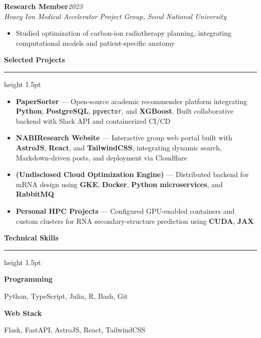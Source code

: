 \documentclass[11pt,a4paper]{article}
\newcommand{\cvsection}[1]{%
  \vspace{1em}
  {\color{sectioncolor}\Large\bfseries #1}
  \vspace{0.2em}
  {\color{sectioncolor}\hrule height 1.5pt}
  \vspace{0.5em}
}
\newcommand{\years}[1]{{\color{gray}\textit{#1}}}
\newenvironment{cvitems}{\begin{itemize}[leftmargin=1.5em, itemsep=0.3em, topsep=0.3em]}{\end{itemize}}
\newcommand{\role}[2]{%
  \textbf{\large #1}\hfill\years{#2}\\[0.1em]
}
\newcommand{\place}[1]{%
  {\color{primarycolor}\textit{#1}}\\[0.3em]
}
\begin{document}
\vspace{0.5em}

\role{Research Member}{2023}
\place{Heavy Ion Medical Accelerator Project Group, Seoul National University}
\begin{cvitems}
  \item Studied optimization of carbon-ion radiotherapy planning, integrating computational models and patient-specific anatomy
\end{cvitems}

\cvsection{Selected Projects}
\begin{cvitems}
  \item \textbf{\color{primarycolor}PaperSorter} — Open-source academic recommender platform integrating \textbf{Python}, \textbf{PostgreSQL}, \texttt{pgvector}, and \textbf{XGBoost}. Built collaborative backend with Slack API and containerized CI/CD
  
  \item \textbf{\color{primarycolor}NABIResearch Website} — Interactive group web portal built with \textbf{AstroJS}, \textbf{React}, and \textbf{TailwindCSS}, integrating dynamic search, Markdown-driven posts, and deployment via Cloudflare
  
  \item \textbf{\color{primarycolor}(Undisclosed Cloud Optimization Engine)} — Distributed backend for mRNA design using \textbf{GKE}, \textbf{Docker}, \textbf{Python microservices}, and \textbf{RabbitMQ}
  
  \item \textbf{\color{primarycolor}Personal HPC Projects} — Configured GPU-enabled containers and custom clusters for RNA secondary-structure prediction using \textbf{CUDA}, \textbf{JAX}
\end{cvitems}


\cvsection{Technical Skills}
\noindent
\begin{minipage}[t]{3.5cm}
\textbf{\color{accentcolor}Programming}
\end{minipage}%
\begin{minipage}[t]{12cm}
Python, TypeScript, Julia, R, Bash, Git
\end{minipage}

\vspace{0.3em}
\noindent
\begin{minipage}[t]{3.5cm}
\textbf{\color{accentcolor}Web Stack}
\end{minipage}%
\begin{minipage}[t]{12cm}
Flask, FastAPI, AstroJS, React, TailwindCSS
\end{minipage}
\end{document}
